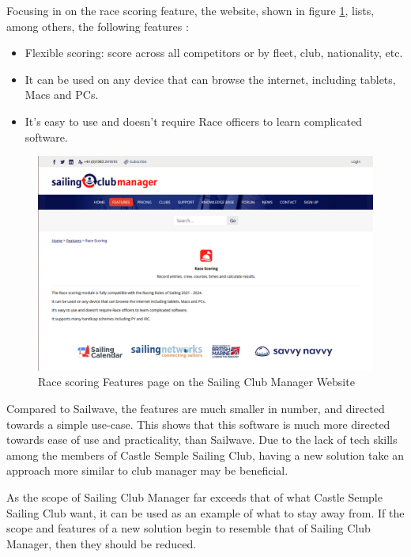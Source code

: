 \documentclass{l4proj}
\begin{document}
Focusing in on the race scoring feature, the website, shown in figure \ref{fig:ClubManager},  lists, among others, the following features \citep{ClubManager}:

\begin{itemize}
    \item
    Flexible scoring: score across all competitors or by fleet, club, nationality, etc.
    \item
    It can be used on any device that can browse the internet, including tablets, Macs and PCs. 
    \item
    It's easy to use and doesn't require Race officers to learn complicated software. 
\end{itemize}

\begin{figure}[H]
    \centering
    \includegraphics[width=1\linewidth]{images/ClubManager.png} 

    \caption{Race scoring Features page on the Sailing Club Manager Website \citep{ClubManager}
    }

    \label{fig:ClubManager}
\end{figure}
Compared to Sailwave, the features are much smaller in number, and directed towards a simple use-case. This shows that this software is much more directed towards ease of use and practicality, than Sailwave. Due to the lack of tech skills among the members of Castle Semple Sailing Club, having a new solution take an approach more similar to club manager may be beneficial.

As the scope of Sailing Club Manager far exceeds that of what Castle Semple Sailing Club want, it can be used as an example of what to stay away from. If the scope and features of a new solution begin to resemble that of Sailing Club Manager, then they should be reduced.
\end{document}
